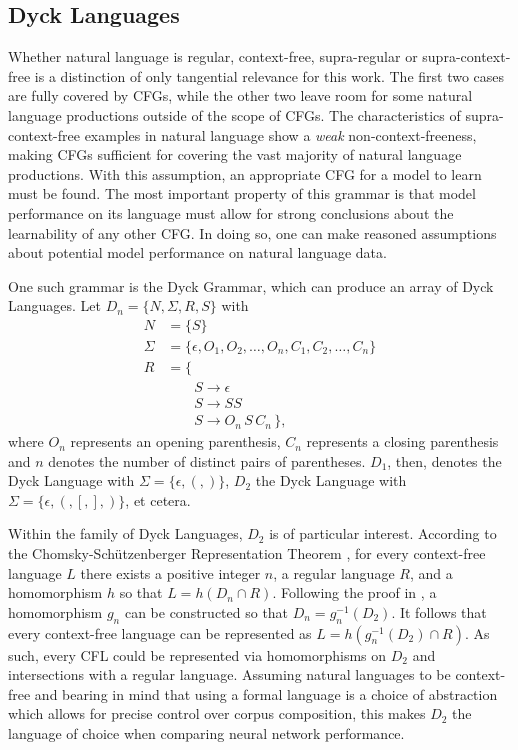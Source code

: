 \subsection{Dyck Languages}\label{dyckLanguages}
Whether natural language is regular, context-free, supra-regular or supra-context-free is a distinction of only tangential relevance for this work. The first two cases are fully covered by CFGs, while the other two leave room for some natural language productions outside of the scope of CFGs. The characteristics of supra-context-free examples in natural language show a \textit{weak} non-context-freeness, making CFGs sufficient for covering the vast majority of natural language productions. With this assumption, an appropriate CFG for a model to learn must be found. The most important property of this grammar is that model performance on its language must allow for strong conclusions about the learnability of any other CFG. In doing so, one can make reasoned assumptions about potential model performance on natural language data. 

One such grammar is the Dyck Grammar, which can produce an array of Dyck Languages. Let $D_{n} = \lbrace N, \Sigma, R, S \rbrace$ with
\begin{align*}
	N &= \lbrace S \rbrace \\
	\Sigma &= \lbrace \epsilon, O_{1}, O_{2}, \dots, O_{n}, C_{1}, C_{2}, \dots, C_{n} \rbrace \\
	R &= \lbrace \\
		 & \qquad S \rightarrow \epsilon \\
		 & \qquad S \rightarrow SS \\
		 & \qquad S \rightarrow O_{n} \, S \, C_{n} \, \rbrace ,
\end{align*}
where $O_{n}$ represents an opening parenthesis, $C_{n}$ represents a closing parenthesis and $n$ denotes the number of distinct pairs of parentheses. $D_1$, then, denotes the Dyck Language with $\Sigma = \lbrace \epsilon, (, ) \rbrace$, $D_2$ the Dyck Language with $\Sigma = \lbrace \epsilon, (, [, ], ) \rbrace$, et cetera.

Within the family of Dyck Languages, $D_2$ is of particular interest. According to the Chomsky-Schützenberger Representation Theorem \citep{Chomsky1963}, for every context-free language $L$ there exists a positive integer $n$, a regular language $R$, and a homomorphism $h$ so that $L = h(D_{n} \cap R)$. Following the proof in \cite{Autebert1997}, a homomorphism $g_{n}$ can be constructed so that $D_{n} = g_{n}^{-1}(D_{2})$. It follows that every context-free language can be represented as $L = h(g_{n}^{-1}(D_{2}) \cap R)$. As such, every CFL could be represented via homomorphisms on $D_2$ and intersections with a regular language. Assuming natural languages to be context-free and bearing in mind that using a formal language is a choice of abstraction which allows for precise control over corpus composition, this makes $D_2$ the language of choice when comparing neural network performance.

